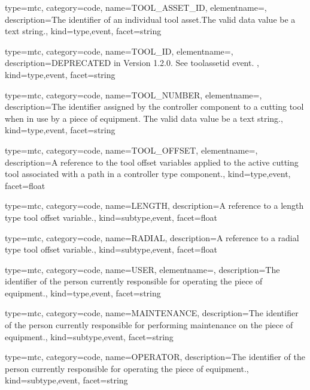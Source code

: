 {
  type=mtc,
  category=code,
  name={TOOL\_ASSET\_ID},
  elementname=,
  description={The identifier of an individual tool asset.The \gls{valid data value} \must be a text string.},
  kind={type,event},
  facet={\gls{string}}
}


{
  type=mtc,
  category=code,
  name={TOOL\_ID},
  elementname=,
  description={DEPRECATED in Version 1.2.0.   See \gls{toolassetid event}. },
  kind={type,event},
  facet={\gls{string}}
}


{
  type=mtc,
  category=code,
  name={TOOL\_NUMBER},
  elementname=,
  description={The identifier assigned by the \gls{controller} component to a cutting tool when in use by a piece of equipment. \newline The \gls{valid data value} \must be a text string.},
  kind={type,event},
  facet={\gls{string}}
}


{
  type=mtc,
  category=code,
  name={TOOL\_OFFSET},
  elementname=,
  description={A reference to the tool offset variables applied to the active cutting tool associated with a \gls{path} in a \gls{controller} type component.},
  kind={type,event},
  facet={\gls{float}}
}


{
  type=mtc,
  category=code,
  name={LENGTH},
  description={A reference to a length type tool offset variable.},
  kind={subtype,event},
  facet={\gls{float}}
}


{
  type=mtc,
  category=code,
  name={RADIAL},
  description={A reference to a radial type tool offset variable.},
  kind={subtype,event},
  facet={\gls{float}}
}


{
  type=mtc,
  category=code,
  name={USER},
  elementname=,
  description={The identifier of the person currently responsible for operating the piece of equipment.},
  kind={type,event},
  facet={\gls{string}}
}


{
  type=mtc,
  category=code,
  name={MAINTENANCE},
  description={The identifier of the person currently responsible for performing maintenance on the piece of equipment.},
  kind={subtype,event},
  facet={\gls{string}}
}


{
  type=mtc,
  category=code,
  name={OPERATOR},
  description={The identifier of the person currently responsible for operating the piece of equipment.},
  kind={subtype,event},
  facet={\gls{string}}
}


